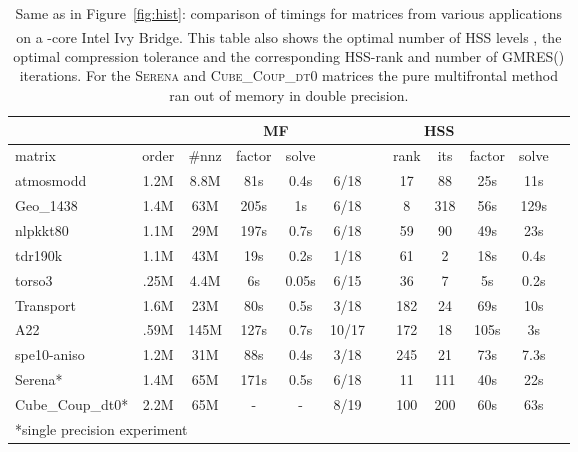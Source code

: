 \documentclass{article}
\newcommand{\tm}{\textsuperscript{\textregistered}}
\begin{document}
\begin{table}\footnotesize
  \renewcommand{\arraystretch}{1}
  \setlength{\tabcolsep}{0.20em}
  \newcommand{\ce}[1]{\multicolumn{1}{c|}{#1}}
  \newcommand{\cee}[1]{\multicolumn{1}{c|}{#1}}
  \begin{center}
    \begin{tabular}{|l||c|c||c|c||c|c|c|c|c|c|c|}
      \cline{4-11}
      \multicolumn{3}{c||}{} & \multicolumn{2}{|c||}{MF} & \multicolumn{6}{|c|}{HSS} \\
      \hline
      matrix     &  order & \#nnz & factor & solve  &  &  & rank & its & factor & solve \\
      \hline  \hline
      atmosmodd  & 1.2M   & 8.8M    & 81s    & 0.4s   & 6/18  &     & 17  & 88  & 25s   & 11s   \\
      \hline
      Geo\_1438  & 1.4M   & 63M   & 205s   & 1s     & 6/18  &     & 8    & 318 & 56s   & 129s  \\
      \hline
      nlpkkt80   & 1.1M   & 29M   & 197s   & 0.7s   & 6/18  &     & 59   & 90  & 49s   & 23s   \\
      \hline
      tdr190k    & 1.1M   & 43M   & 19s    & 0.2s   & 1/18  &  & 61   &  2 & 18s   & 0.4s  \\
      \hline
      torso3     & .25M   & 4.4M    & 6s     & 0.05s  & 6/15  &    & 36  &  7 & 5s    & 0.2s  \\
      \hline
      Transport  & 1.6M   & 23M   & 80s    & 0.5s   & 3/18  &  & 182  & 24 & 69s   & 10s   \\
      \hline
      A22        & .59M   & 145M  & 127s   & 0.7s   & 10/17 &     & 172  & 18 & 105s  & 3s    \\
      \hline
      spe10-aniso & 1.2M  & 31M   & 88s    & 0.4s   & 3/18  &  & 245  & 21 & 73s  & 7.3s    \\
      \hline
      Serena*     & 1.4M  & 65M   & 171s   & 0.5s   & 6/18  &     & 11   & 111  & 40s  & 22s    \\
      \hline
      Cube\_Coup\_dt0* & 2.2M & 65M & -     & -      & 8/19  &     & 100  & 200  & 60s  & 63s \\
      \hline
      \multicolumn{3}{l}{*single precision experiment}
    \end{tabular}
  \end{center}
  \caption{\footnotesize Same as in Figure~\ref{fig:hist}: comparison of timings for matrices from various
    applications on a -core Intel\tm{} Ivy Bridge. This table also shows the optimal 
    number of HSS levels , the optimal compression tolerance  and
    the corresponding HSS-rank and number of GMRES() iterations.
    For the \textsc{Serena} and \textsc{Cube\_Coup\_dt0} matrices the pure multifrontal
    method ran out of memory in double precision. }
  \label{tab:matrix_list}
\end{table}
\end{document}
